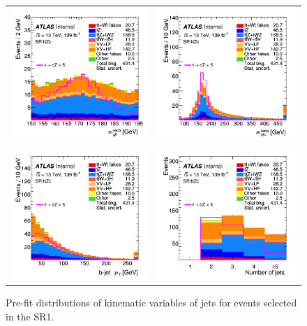 \begin{figure}[]
	\centering
	\begin{tabular}{cc}
		\includegraphics[width=.35\textwidth]{Appendices/AP5/figures/SR1/tFCNC} &
		\includegraphics[width=.35\textwidth]{Appendices/AP5/figures/SR1/tSM} \\
		\includegraphics[width=.35\textwidth]{Appendices/AP5/figures/SR1/b_pt} & 
		\includegraphics[width=.35\textwidth]{Appendices/AP5/figures/SR1/nJets} \\
	\end{tabular}
	\caption{Pre-fit distributions of kinematic variables of jets for events selected in the SR1\tZc.
		\ErrStatOnly
		\Blinded
	}%
	\label{fig:sel:sr1:jets}
\end{figure}

